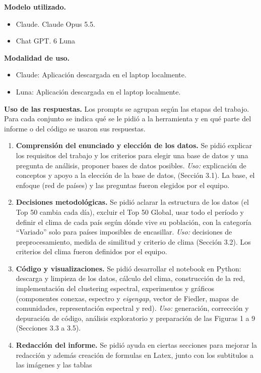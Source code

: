 \documentclass[11pt,a4paper]{article}
\begin{document}
\textbf{Modelo utilizado.}
\begin{itemize}[leftmargin=1.5em]
\item Claude. Claude Opus 5.5.
\item Chat GPT. 6 Luna
\end{itemize}

\textbf{Modalidad de uso.}
\begin{itemize}[leftmargin=1.5em]
\item Claude: Aplicación descargada en el laptop localmente.
\item Luna: Aplicación descargada en el laptop localmente.
\end{itemize}

\textbf{Uso de las respuestas.} Los prompts se agrupan según las etapas del trabajo. Para cada conjunto se indica qué se le pidió a la herramienta y en qué parte del informe o del código se usaron sus respuestas.

\begin{enumerate}[leftmargin=1.5em]
\item \textbf{Comprensión del enunciado y elección de los datos.} Se pidió explicar los requisitos del trabajo y los criterios para elegir una base de datos y una pregunta de análisis, proponer bases de datos posibles. \emph{Uso:} explicación de conceptos y apoyo a la elección de la base de datos, (Sección 3.1). La base, el enfoque (red de países) y las preguntas fueron elegidos por el equipo.
\item \textbf{Decisiones metodológicas.} Se pidió aclarar la estructura de los datos (el Top 50 cambia cada día), excluir el Top 50 Global, usar todo el período y definir el clima de cada país según dónde vive su población, con la categoría ``Variado'' solo para países imposibles de encasillar. \emph{Uso:} decisiones de preprocesamiento, medida de similitud y criterio de clima (Sección 3.2). Los criterios del clima fueron definidos por el equipo.
\item \textbf{Código y visualizaciones.} Se pidió desarrollar el notebook en Python: descarga y limpieza de los datos, cálculo del clima, construcción de la red, implementación del clustering espectral, experimentos y gráficos (componentes conexas, espectro y \emph{eigengap}, vector de Fiedler, mapas de comunidades, representación espectral y red). \emph{Uso:} generación, corrección y depuración de código, análisis exploratorio y preparación de las Figuras 1 a 9 (Secciones 3.3 a 3.5).
\item \textbf{Redacción del informe.} Se pidió ayuda en ciertas secciones para mejorar la redacción y además creación de formulas en Latex, junto con los subtitulos a las imágenes y las tablas
\end{enumerate}
\end{document}
